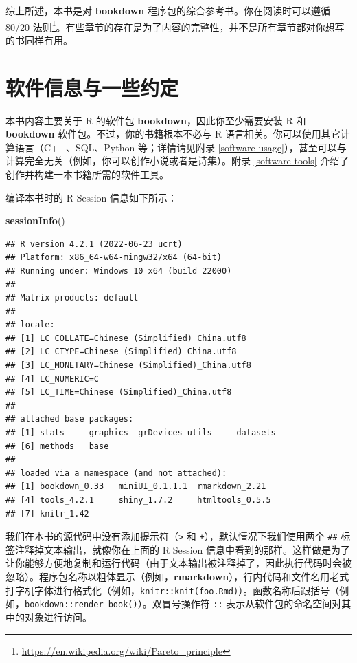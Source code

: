 \documentclass[
  12pt,
]{krantz}
\newenvironment{Shaded}{\begin{snugshade}}{\end{snugshade}}
\newcommand{\FunctionTok}[1]{\textcolor[rgb]{0.13,0.29,0.53}{\textbf{#1}}}
\newcommand{\NormalTok}[1]{#1}
\renewcommand{\href}[2]{#2\footnote{\url{#1}}}
\theoremstyle{definition}
\theoremstyle{definition}
\theoremstyle{definition}
\theoremstyle{definition}
\theoremstyle{remark}
\begin{document}
综上所述，本书是对 \textbf{bookdown} 程序包的综合参考书。你在阅读时可以遵循 \href{https://en.wikipedia.org/wiki/Pareto_principle}{80/20 法则}。有些章节的存在是为了内容的完整性，并不是所有章节都对你想写的书同样有用。

\hypertarget{ux8f6fux4ef6ux4fe1ux606fux4e0eux4e00ux4e9bux7ea6ux5b9a}{%
\section*{软件信息与一些约定}\label{ux8f6fux4ef6ux4fe1ux606fux4e0eux4e00ux4e9bux7ea6ux5b9a}}


本书内容主要关于 R 的软件包 \textbf{bookdown}，因此你至少需要安装 R 和 \textbf{bookdown} 软件包。不过，你的书籍根本不必与 R 语言相关。你可以使用其它计算语言（C++、SQL、Python 等；详情请见附录 \ref{software-usage}），甚至可以与计算完全无关（例如，你可以创作小说或者是诗集）。附录 \ref{software-tools} 介绍了创作并构建一本书籍所需的软件工具。

编译本书时的 R Session 信息如下所示：

\begin{Shaded}
\begin{Highlighting}[]
\FunctionTok{sessionInfo}\NormalTok{()}
\end{Highlighting}
\end{Shaded}

\begin{verbatim}
## R version 4.2.1 (2022-06-23 ucrt)
## Platform: x86_64-w64-mingw32/x64 (64-bit)
## Running under: Windows 10 x64 (build 22000)
## 
## Matrix products: default
## 
## locale:
## [1] LC_COLLATE=Chinese (Simplified)_China.utf8 
## [2] LC_CTYPE=Chinese (Simplified)_China.utf8   
## [3] LC_MONETARY=Chinese (Simplified)_China.utf8
## [4] LC_NUMERIC=C                               
## [5] LC_TIME=Chinese (Simplified)_China.utf8    
## 
## attached base packages:
## [1] stats     graphics  grDevices utils     datasets 
## [6] methods   base     
## 
## loaded via a namespace (and not attached):
## [1] bookdown_0.33   miniUI_0.1.1.1  rmarkdown_2.21 
## [4] tools_4.2.1     shiny_1.7.2     htmltools_0.5.5
## [7] knitr_1.42
\end{verbatim}

我们在本书的源代码中没有添加提示符（\texttt{\textgreater{}} 和 \texttt{+}），默认情况下我们使用两个 \texttt{\#\#} 标签注释掉文本输出，就像你在上面的 R Session 信息中看到的那样。这样做是为了让你能够方便地复制和运行代码（由于文本输出被注释掉了，因此执行代码时会被忽略）。程序包名称以粗体显示（例如，\textbf{rmarkdown}），行内代码和文件名用老式打字机字体进行格式化（例如，\texttt{knitr::knit(\textquotesingle{}foo.Rmd\textquotesingle{})}）。函数名称后跟括号（例如，\texttt{bookdown::render\_book()}）。双冒号操作符 \texttt{::} 表示从软件包的命名空间对其中的对象进行访问。
\end{document}

